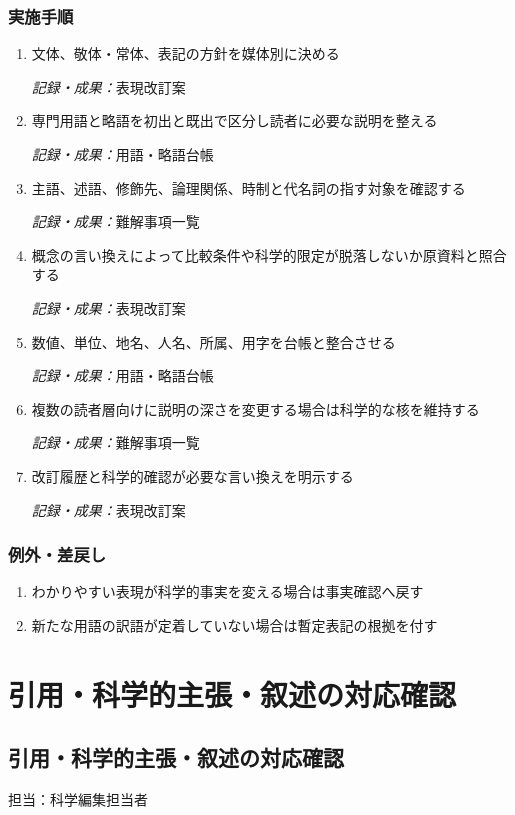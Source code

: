 \documentclass[a4paper,11pt]{article}
\begin{document}
\subsubsection*{実施手順}
\begin{enumerate}[leftmargin=2em,itemsep=0.65em]
\item 文体、敬体・常体、表記の方針を媒体別に決める\par\noindent\textit{記録・成果：}表現改訂案\nobreak\smallskip
\item 専門用語と略語を初出と既出で区分し読者に必要な説明を整える\par\noindent\textit{記録・成果：}用語・略語台帳\nobreak\smallskip
\item 主語、述語、修飾先、論理関係、時制と代名詞の指す対象を確認する\par\noindent\textit{記録・成果：}難解事項一覧\nobreak\smallskip
\item 概念の言い換えによって比較条件や科学的限定が脱落しないか原資料と照合する\par\noindent\textit{記録・成果：}表現改訂案\nobreak\smallskip
\item 数値、単位、地名、人名、所属、用字を台帳と整合させる\par\noindent\textit{記録・成果：}用語・略語台帳\nobreak\smallskip
\item 複数の読者層向けに説明の深さを変更する場合は科学的な核を維持する\par\noindent\textit{記録・成果：}難解事項一覧\nobreak\smallskip
\item 改訂履歴と科学的確認が必要な言い換えを明示する\par\noindent\textit{記録・成果：}表現改訂案\nobreak\smallskip
\end{enumerate}
\subsubsection*{例外・差戻し}
\begin{enumerate}[leftmargin=2em,itemsep=0.35em]
\item わかりやすい表現が科学的事実を変える場合は事実確認へ戻す
\item 新たな用語の訳語が定着していない場合は暫定表記の根拠を付す
\end{enumerate}
\section{引用・科学的主張・叙述の対応確認}
\subsection{引用・科学的主張・叙述の対応確認}
\par 担当：科学編集担当者\par\medskip
\end{document}
